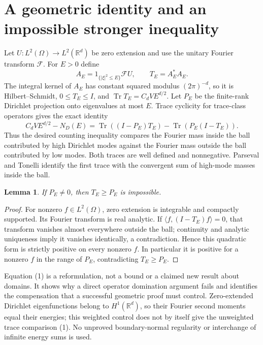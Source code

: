 \documentclass[11pt]{article}
\newtheorem{lemma}{Lemma}
\newcommand{\Tr}{\operatorname{Tr}}
\begin{document}
\section{A geometric identity and an impossible stronger inequality}
Let $U:L^2(\Omega)\to L^2(\mathbb R^d)$ be zero extension and use the
unitary Fourier transform $\mathcal F$. For $E>0$ define
\[
 A_E=1_{\{|\xi|^2\leq E\}}\mathcal F U,\qquad T_E=A_E^*A_E.
\]
The integral kernel of $A_E$ has constant squared modulus $(2\pi)^{-d}$,
so it is Hilbert--Schmidt, $0\leq T_E\leq I$, and
$\Tr T_E=C_dVE^{d/2}$. Let $P_E$ be the finite-rank Dirichlet projection
onto eigenvalues at most $E$. Trace cyclicity for trace-class operators
gives the exact identity
\[
 C_dVE^{d/2}-N_D(E)
 =\Tr((I-P_E)T_E)-\Tr(P_E(I-T_E)).                 \tag{1}
\]
Thus the desired counting inequality compares the Fourier mass inside the
ball contributed by high Dirichlet modes against the Fourier mass outside
the ball contributed by low modes. Both traces are well defined and
nonnegative. Parseval and Tonelli identify the first trace with the
convergent sum of high-mode masses inside the ball.

\begin{lemma}
If $P_E\ne0$, then $T_E\geq P_E$ is impossible.
\end{lemma}
\begin{proof}
For nonzero $f\in L^2(\Omega)$, zero extension is integrable and compactly
supported. Its Fourier transform is real analytic. If
$\langle f,(I-T_E)f\rangle=0$, that transform vanishes almost everywhere
outside the ball; continuity and analytic uniqueness imply it vanishes
identically, a contradiction. Hence this quadratic form is strictly
positive on every nonzero $f$. In particular it is positive for a nonzero
$f$ in the range of $P_E$, contradicting $T_E\geq P_E$.
\end{proof}

Equation (1) is a reformulation, not a bound or a claimed new result about
domains. It shows why a direct operator domination argument fails and
identifies the compensation that a successful geometric proof must control.
Zero-extended Dirichlet eigenfunctions belong to $H^1(\mathbb R^d)$, so
their Fourier second moments equal their energies; this weighted control
does not by itself give the unweighted trace comparison (1). No unproved
boundary-normal regularity or interchange of infinite energy sums is used.
\end{document}

